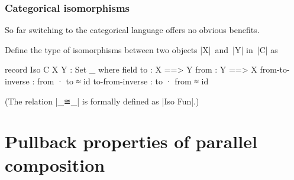 \subsubsection{Categorical isomorphisms}

So far switching to the categorical language offers no obvious benefits.

Define the type of isomorphisms between two objects |X|~and~|Y| in~|C| as
\begin{code}
record Iso C X Y : Set _ where
  field
    to    : X ==> Y
    from  : Y ==> X
    from-to-inverse  : from · to ≈ id
    to-from-inverse  : to · from ≈ id
\end{code}
(The relation |_≅_| is formally defined as |Iso Fun|.)


\section{Pullback properties of parallel composition}
\label{sec:parallel-composition-pullback}

